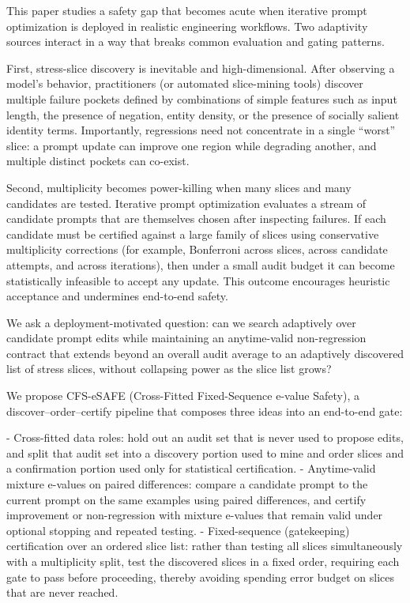 \documentclass{article} %
\begin{document}
This paper studies a safety gap that becomes acute when iterative prompt optimization is deployed in realistic engineering workflows. Two adaptivity sources interact in a way that breaks common evaluation and gating patterns.

First, stress-slice discovery is inevitable and high-dimensional. After observing a model’s behavior, practitioners (or automated slice-mining tools) discover multiple failure pockets defined by combinations of simple features such as input length, the presence of negation, entity density, or the presence of socially salient identity terms. Importantly, regressions need not concentrate in a single “worst” slice: a prompt update can improve one region while degrading another, and multiple distinct pockets can co-exist.

Second, multiplicity becomes power-killing when many slices and many candidates are tested. Iterative prompt optimization evaluates a stream of candidate prompts that are themselves chosen after inspecting failures. If each candidate must be certified against a large family of slices using conservative multiplicity corrections (for example, Bonferroni across slices, across candidate attempts, and across iterations), then under a small audit budget it can become statistically infeasible to accept any update. This outcome encourages heuristic acceptance and undermines end-to-end safety.

We ask a deployment-motivated question: can we search adaptively over candidate prompt edits while maintaining an anytime-valid non-regression contract that extends beyond an overall audit average to an adaptively discovered list of stress slices, without collapsing power as the slice list grows?

We propose CFS-eSAFE (Cross-Fitted Fixed-Sequence e-value Safety), a discover–order–certify pipeline that composes three ideas into an end-to-end gate:

- Cross-fitted data roles: hold out an audit set that is never used to propose edits, and split that audit set into a discovery portion used to mine and order slices and a confirmation portion used only for statistical certification.
- Anytime-valid mixture e-values on paired differences: compare a candidate prompt to the current prompt on the same examples using paired differences, and certify improvement or non-regression with mixture e-values that remain valid under optional stopping and repeated testing.
- Fixed-sequence (gatekeeping) certification over an ordered slice list: rather than testing all slices simultaneously with a multiplicity split, test the discovered slices in a fixed order, requiring each gate to pass before proceeding, thereby avoiding spending error budget on slices that are never reached.
\end{document}
